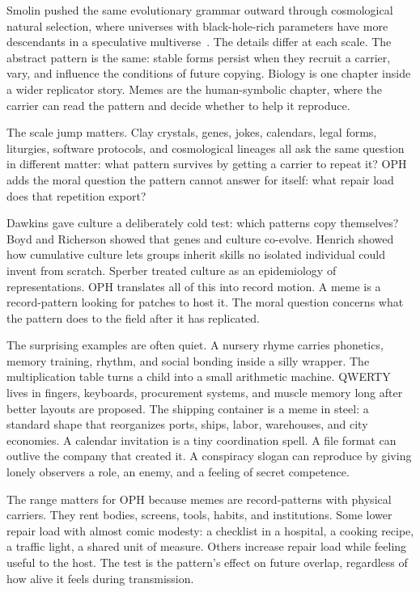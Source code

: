 \documentclass[11pt]{article}
\theoremstyle{remark}
\theoremstyle{plain}
\begin{document}
Smolin pushed the same evolutionary grammar outward through cosmological
natural selection, where universes with black-hole-rich parameters have more
descendants in a speculative multiverse~\cite{Smolin1997}. The details differ
at each scale. The abstract pattern is the same: stable forms persist when they
recruit a carrier, vary, and influence the conditions of future copying.
Biology is one chapter inside a wider replicator story. Memes are the
human-symbolic chapter, where the carrier can read the pattern and decide
whether to help it reproduce.

The scale jump matters. Clay crystals, genes, jokes, calendars, legal forms,
liturgies, software protocols, and cosmological lineages all ask the same
question in different matter: what pattern survives by getting a carrier to
repeat it? OPH adds the moral question the pattern cannot answer for itself:
what repair load does that repetition export?

Dawkins gave culture a deliberately cold test: which patterns copy themselves?
Boyd and Richerson showed that genes and culture co-evolve. Henrich showed how
cumulative culture lets groups inherit skills no isolated individual could
invent from scratch. Sperber treated culture as an epidemiology of
representations. OPH translates all of this into record motion. A meme is a
record-pattern looking for patches to host it. The moral question concerns what
the pattern does to the field after it has replicated.

The surprising examples are often quiet. A nursery rhyme carries phonetics,
memory training, rhythm, and social bonding inside a silly wrapper. The
multiplication table turns a child into a small arithmetic machine. QWERTY lives
in fingers, keyboards, procurement systems, and muscle memory long after better
layouts are proposed. The shipping container is a meme in steel: a standard
shape that reorganizes ports, ships, labor, warehouses, and city economies. A
calendar invitation is a tiny coordination spell. A file format can outlive the
company that created it. A conspiracy slogan can reproduce by giving lonely
observers a role, an enemy, and a feeling of secret competence.

The range matters for OPH because memes are record-patterns with physical
carriers. They rent bodies, screens, tools, habits, and institutions. Some lower
repair load with almost comic modesty: a checklist in a hospital, a cooking
recipe, a traffic light, a shared unit of measure. Others increase repair load
while feeling useful to the host. The test is the pattern's effect on future
overlap, regardless of how alive it feels during transmission.
\end{document}

